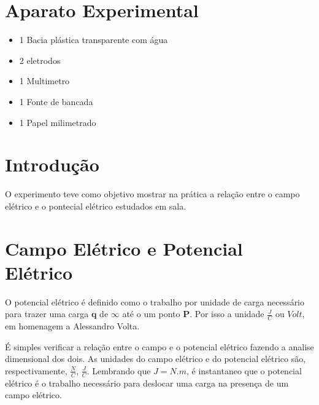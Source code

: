 \documentclass[
12pt,				%
oneside,			%
a4paper,			%
english,			%
french,				%
spanish,			%
brazil				%
]{abntex2}
\begin{document}


\tableofcontents*
\cleardoublepage
{}	%



\textual


\chapter{Aparato Experimental}
\begin{itemize}
\large
\item 1 Bacia plástica transparente com água

\item 2 eletrodos

\item 1 Multimetro

\item 1 Fonte de bancada

\item 1 Papel milimetrado

\end{itemize}
\normalsize
\chapter{Introdução}

O experimento teve como objetivo mostrar na prática a relação entre o campo elétrico e o pontecial elétrico estudados em sala.

\chapter{Campo Elétrico e Potencial Elétrico}

O potencial elétrico é definido como o trabalho por unidade de carga necessário para trazer uma carga ${\mathbf q}$ de ${\mathbf \infty}$ até o um ponto ${\mathbf P}$. Por isso a unidade $\frac{J}{C}$ ou $Volt$, em homenagem a Alessandro Volta.

É simples verificar a relação entre o campo e o potencial elétrico fazendo a analise dimensional dos dois. As unidades do campo elétrico e do potencial elétrico são, respectivamente, $\frac{N}{C}$, $\frac{J}{C}$. Lembrando que $J = N.m$, é instantaneo que o potencial elétrico é o trabalho necessário para deslocar uma carga na presença de um campo elétrico.
\end{document}
